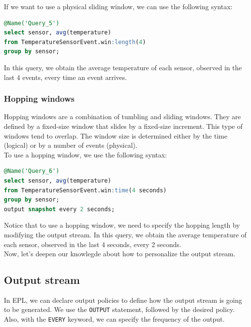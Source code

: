 If we want to use a physical sliding window, we can use the following syntax:\\

\begin{lstlisting}[language=SQL]
@Name('Query_5')
select sensor, avg(temperature)
from TemperatureSensorEvent.win:length(4)
group by sensor;
\end{lstlisting}

In this query, we obtain the average temperature of each sensor, observed
in the last 4 events, every time an event arrives.\\

\subsubsection{Hopping windows}

Hopping windows are a combination of tumbling and sliding windows. They are
defined by a fixed-size window that slides by a fixed-size increment. This type
of windows tend to overlap. The window size is determined either by the time 
(logical) or by a number of events (physical).\\

To use a hopping window, we use the following syntax:\\

\begin{lstlisting}[language=SQL]
@Name('Query_6')
select sensor, avg(temperature)
from TemperatureSensorEvent.win:time(4 seconds)
group by sensor;
output snapshot every 2 seconds;
\end{lstlisting}

Notice that to use a hopping window, we need to specify the hopping length by
modifying the output stream. In this query, we obtain the average temperature of
each sensor, observed in the last 4 seconds, every 2 seconds.\\

Now, let's deepen our knowlegde about how to personalize the output stream.

\subsection{Output stream}

In EPL, we can declare output policies to define how the output stream is going
to be generated. We use the \texttt{OUTPUT} statement, followed by the desired
policy. Also, with the \texttt{EVERY} keyword, we can specify the frequency of 
the output.\\

